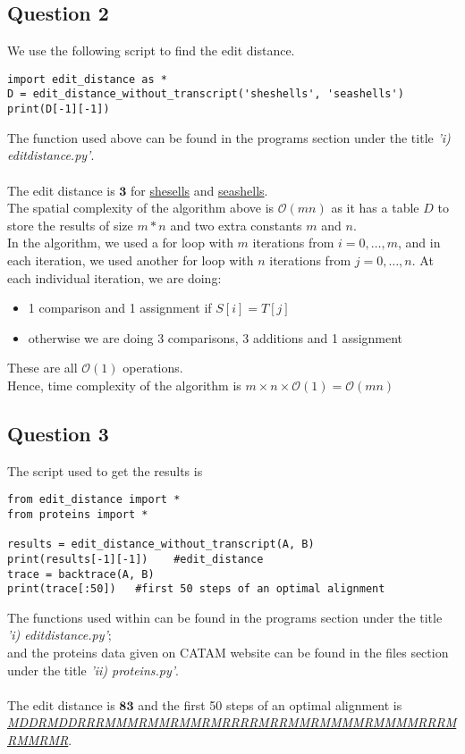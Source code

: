 \documentclass[10pt]{article}
\begin{document}
\subsection*{Question 2}
We use the following script to find the edit distance.
\begin{lstlisting}
import edit_distance as *
D = edit_distance_without_transcript('sheshells', 'seashells')
print(D[-1][-1])
\end{lstlisting}
The function used above can be found in the programs section under the title \emph{'i) edit\textunderscore distance.py'}.\\\\
The edit distance is \underline{$\bm{3}$} for \underline{shesells} and \underline{seashells}.\\
The spatial complexity of the algorithm above is $\mathcal{O}(mn)$ as it has a table $D$ to store the results of size $m*n$ and two extra constants $m$ and $n$.\\
In the algorithm, we used a for loop with $m$ iterations from $i=0,\dots,m$, and in each iteration, we used another for loop with $n$ iterations from $j=0,\dots,n$. At each individual iteration, we are doing:
\begin{itemize}
    \item 1 comparison and 1 assignment if $S[i]=T[j]$
    \item otherwise we are doing 3 comparisons, 3 additions and 1 assignment
\end{itemize}
These are all $\mathcal{O}(1)$ operations.\\
Hence, time complexity of the algorithm is $m\times n \times \mathcal{O}(1)=\mathcal{O}(mn)$
\bigskip
\subsection*{Question 3}
The script used to get the results is 
\begin{lstlisting}
from edit_distance import *
from proteins import *

results = edit_distance_without_transcript(A, B)
print(results[-1][-1])    #edit_distance
trace = backtrace(A, B)
print(trace[:50])   #first 50 steps of an optimal alignment
\end{lstlisting}
The functions used within can be found in the programs section under the title \emph{'i) edit\textunderscore distance.py'};\\ and the proteins data given on CATAM website can be found in the files section under the title \emph{'ii) proteins.py'}.\\\\
The edit distance is \underline{$\bm{83}$} and the first 50 steps of an optimal alignment is\\ \underline{\textit{MDDRMDDRRRMMMRMMRMMRMRRRRMRRMMRMMMMRMMMMRRRMRMMRMR}}.\\
\end{document}
